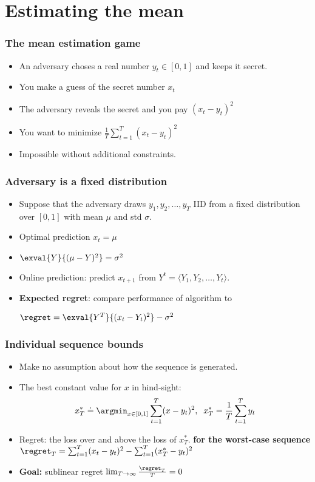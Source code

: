 \documentclass[handout]{beamer}
\begin{document}
\section{Estimating the mean}

\begin{frame}
\frametitle{The mean estimation game}
\begin{itemize}
\item 
An adversary choses a real number $y_t \in [0,1]$ and keeps it secret.
\item
You make a guess of the secret number $x_t$
\item
The adversary reveals the secret and you pay $(x_t-y_t)^2$ 
\end{itemize}
\begin{itemize}
\item You want to minimize $\frac{1}{T}\sum_{t=1}^T \left(x_t-y_t \right)^2$
\item Impossible without additional constraints.
\end{itemize}
\end{frame}

\begin{frame}
\frametitle{Adversary is a fixed distribution}
\begin{itemize}
\item 
Suppose that the adversary draws $y_1,y_2,\ldots,y_T$ IID from a fixed
distribution over $[0,1]$ with mean $\mu$ and std $\sigma$.
\item
Optimal prediction $x_t = \mu$ 
\item 
  $\exval{Y}{(\mu-Y)^2} = \sigma^2$
\item Online prediction: predict $x_{t+1}$ from $Y^t = \langle
  Y_1,Y_2,\ldots,Y_t \rangle$.
\item {\bf Expected regret}: compare performance of algorithm to
  
  $ \regret = \exval{Y^T}{(x_t-Y_t)^2} - \sigma^2$
\end{itemize}
\end{frame}

\begin{frame}
\frametitle{Individual sequence bounds}
\begin{itemize}
\item Make no assumption about how the sequence is generated.
\item The best constant value for $x$ in hind-sight:\\
  $$x^*_T \doteq \argmin_{x \in [0,1]} \sum_{t=1}^T (x-y_t)^2,\;\; x^*_T=\frac{1}{T}
  \sum_{t=1}^T y_t$$ 
\item Regret: the loss over and above the loss of $x^*_T$. {\bf for the
    worst-case sequence}
  $ \regret_T = \sum_{t=1}^T (x_t-y_t)^2 - \sum_{t=1}^T (x^*_T-y_t)^2
  $
\item {\bf Goal:} sublinear regret $\lim_{T \to \infty} \frac{\regret_T}{T} = 0$
\end{itemize}
\end{frame}
\end{document}
